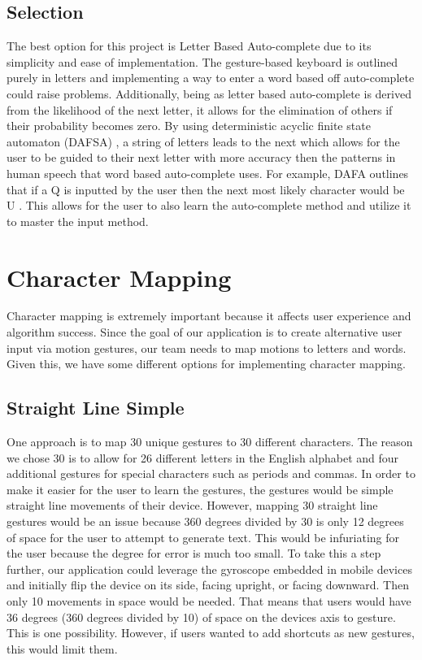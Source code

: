 \documentclass[onecolumn, draftclsnofoot,10pt, journal, letterpaper]{IEEEtran}
\begin{document}
    \subsection{Selection}
        The best option for this project is Letter Based Auto-complete due to its simplicity and ease of implementation. The gesture-based keyboard is outlined purely in letters and implementing a way to enter a word based off auto-complete could raise problems. Additionally, being as letter based auto-complete is derived from the likelihood of the next letter, it allows for the elimination of others if their probability becomes zero. By using deterministic acyclic finite state automaton (DAFSA) \cite{Construction}, a string of letters leads to the next which allows for the user to be guided to their next letter with more accuracy then the patterns in human speech that word based auto-complete uses. For example, DAFA outlines that if a Q is inputted by the user then the next most likely character would be U \cite{Construction}. This allows for the user to also learn the auto-complete method and utilize it to master the input method.

\section{Character Mapping}
    Character mapping is extremely important because it affects user experience and algorithm success. Since the goal of our application is to create alternative user input via motion gestures, our team needs to map motions to letters and words. Given this, we have some different options for implementing character mapping. 
    
    \subsection{Straight Line Simple}
        One approach is to map 30 unique gestures to 30 different characters. The reason we chose 30 is to allow for 26 different letters in the English alphabet and four additional gestures for special characters such as periods and commas. In order to make it easier for the user to learn the gestures, the gestures would be simple straight line movements of their device. However, mapping 30 straight line gestures would be an issue because 360 degrees divided by 30 is only 12 degrees of space for the user to attempt to generate text. This would be infuriating for the user because the degree for error is much too small. To take this a step further, our application could leverage the gyroscope embedded in mobile devices and initially flip the device on its side, facing upright, or facing downward. Then only 10 movements in space would be needed. That means that users would have 36 degrees (360 degrees divided by 10) of space on the devices axis to gesture. This is one possibility. However, if users wanted to add shortcuts as new gestures, this would limit them.
    
\end{document}

